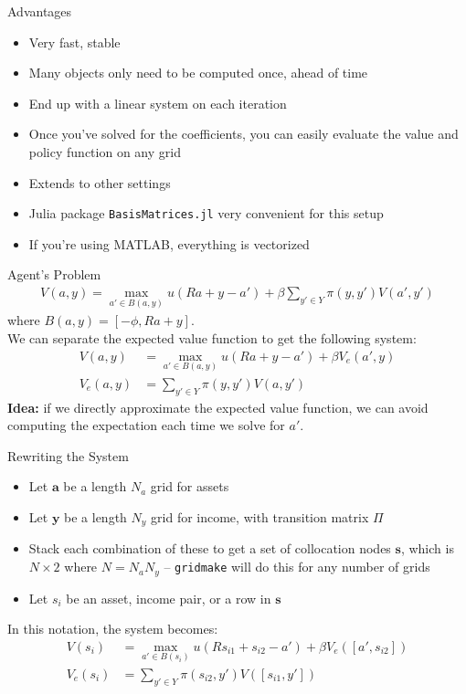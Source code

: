 \documentclass{beamer}
\begin{document}
\begin{frame}{Advantages}
\begin{itemize}
\item Very fast, stable
\item Many objects only need to be computed once, ahead of time
\item End up with a linear system on each iteration
\item Once you've solved for the coefficients, you can easily evaluate the value and policy function on any grid
\item Extends to other settings
\item Julia package \texttt{BasisMatrices.jl} very convenient for this setup
\item If you're using MATLAB, everything is vectorized
\end{itemize}
\end{frame}

\begin{frame}{Agent's Problem}
\begin{align*}
    V(a, y) = \max_{a' \in B(a, y)} u(Ra + y - a') + \beta \displaystyle \sum_{y' \in Y} \pi(y, y') V(a', y') 
\end{align*}
where $B(a, y) = [-\phi, Ra + y]$. \\ \vspace{1mm}
We can separate the expected value function to get the following system:
\begin{align*}
    V(a, y) &= \max_{a' \in B(a, y)} u(Ra + y - a') + \beta V_e(a', y) \\
    V_e(a, y) &= \displaystyle \sum_{y' \in Y} \pi(y, y') V(a, y')
\end{align*}
\textbf{Idea:} if we directly approximate the expected value function, we can avoid computing the expectation each time we solve for $a'$.
\end{frame}

\begin{frame}{Rewriting the System}
\begin{itemize}
\item Let $\mathbf{a}$ be a length $N_a$ grid for assets
\item Let $\mathbf{y}$ be a length $N_y$ grid for income, with transition matrix $\Pi$
\item Stack each combination of these to get a set of collocation nodes $\mathbf{s}$, which is $N \times 2$ where $N = N_a N_y$ -- \texttt{gridmake} will do this for any number of grids
\item Let $s_i$ be an asset, income pair, or a row in $\mathbf{s}$  
\end{itemize}
In this notation, the system becomes: 
\begin{align*}
    V(s_i) &= \max_{a' \in B(s_i)} u(Rs_{i1} + s_{i2} - a') + \beta V_e([a', s_{i2}]) \\
    V_e(s_i) &= \displaystyle \sum_{y' \in Y} \pi(s_{i2}, y') V([s_{i1}, y'])
\end{align*}
\end{frame}
\end{document}
